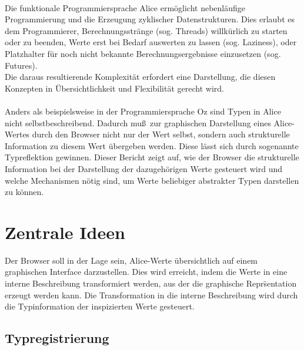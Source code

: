 \documentclass[12pt,a4paper]{article}
\begin{document}
\paragraph{}

Die funktionale Programmiersprache Alice erm\"{o}glicht nebenl\"{a}ufige 
Programmierung und die Erzeugung zyklischer Datenstrukturen. 
Dies erlaubt es dem Programmierer, Berechnungsstr\"{a}nge (sog. Threads) 
willk\"{u}rlich zu starten oder zu beenden, Werte erst bei 
Bedarf auswerten zu lassen (sog. Laziness), oder Platzhalter 
f\"{u}r noch nicht bekannte Berechnungsergebnisse einzusetzen (sog. Futures).
\\
Die daraus resultierende Komplexit\"{a}t erfordert eine Darstellung, 
die diesen Konzepten in \"{U}bersichtlichkeit und Flexibilit\"{a}t gerecht 
wird.

\paragraph{}

Anders als beispielsweise in der Programmiersprache Oz sind 
Typen in Alice nicht selbstbeschreibend. Dadurch mu\ss \, 
zur graphischen Darstellung eines Alice-Wertes durch den 
Browser nicht nur 
der Wert selbst, sondern auch strukturelle 
Information zu diesem Wert \"{u}bergeben werden. Diese l\"{a}sst sich durch 
sogenannte Typreflektion gewinnen. Dieser Bericht zeigt auf, 
wie der Browser die strukturelle Information 
bei der Darstellung der dazugeh\"{o}rigen Werte gesteuert wird und 
welche Mechanismen n\"{o}tig sind, um Werte beliebiger abstrakter Typen 
darstellen zu k\"{o}nnen.



\section{Zentrale Ideen}

Der Browser soll in der Lage sein, Alice-Werte 
\"ubersichtlich auf einem graphischen Interface darzustellen. 
Dies wird erreicht, indem die Werte in eine interne Beschreibung 
transformiert werden, aus der die graphische Repr\"sentation 
erzeugt werden kann. Die Transformation in 
die interne Beschreibung wird durch die 
Typinformation der inspizierten Werte gesteuert. 

\subsection{Typregistrierung}
\end{document}
